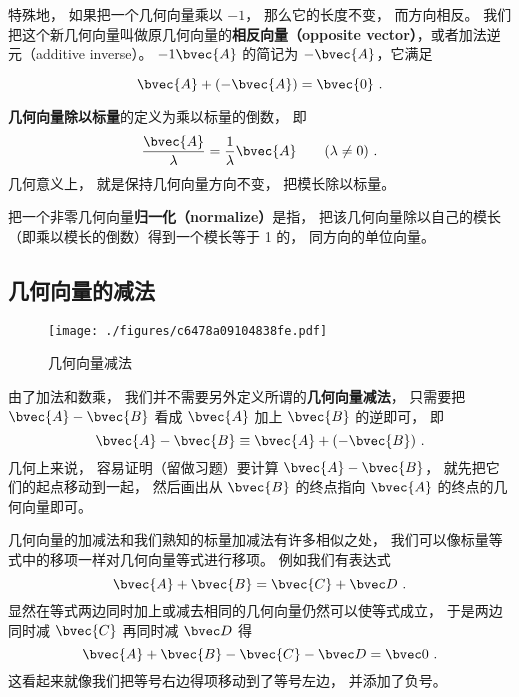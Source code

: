 特殊地， 如果把一个几何向量乘以 $-1$， 那么它的长度不变， 而方向相反。 我们把这个新几何向量叫做原几何向量的\textbf{相反向量（opposite vector）}，或者加法逆元（additive inverse）。 $-1 \bvec{A}$ 的简记为 $-\bvec{A}$，它满足

\begin{equation}
\bvec{A} + (-\bvec{A}) = \bvec{0}~.
\end{equation}

\textbf{几何向量除以标量}的定义为乘以标量的倒数， 即
\begin{equation}
\frac{\bvec{A}}{\lambda} = \frac{1}{\lambda} \bvec{A} \qquad (\lambda \ne 0)~.
\end{equation}
几何意义上， 就是保持几何向量方向不变， 把模长除以标量。

把一个非零几何向量\textbf{归一化（normalize）}是指， 把该几何向量除以自己的模长（即乘以模长的倒数）得到一个模长等于 1 的， 同方向的单位向量。

\subsection{几何向量的减法}

\begin{figure}[ht]
\centering
\texttt{[image: ./figures/c6478a09104838fe.pdf]}
\caption{几何向量减法} \label{fig_GVecOp_3}
\end{figure}
由了加法和数乘， 我们并不需要另外定义所谓的\textbf{几何向量减法}， 只需要把 $\bvec{A} - \bvec{B}$ 看成 $\bvec{A}$ 加上 $\bvec{B}$ 的逆即可， 即
\begin{equation}
\bvec{A} - \bvec{B} \equiv \bvec{A} + (-\bvec{B})~.
\end{equation}
几何上来说， 容易证明（留做习题）要计算 $\bvec{A} - \bvec{B}$， 就先把它们的起点移动到一起， 然后画出从 $\bvec{B}$ 的终点指向 $\bvec{A}$ 的终点的几何向量即可。

几何向量的加减法和我们熟知的标量加减法有许多相似之处， 我们可以像标量等式中的移项一样对几何向量等式进行移项。 例如我们有表达式
\begin{equation}
\bvec{A} + \bvec{B} = \bvec{C} + \bvec D~.
\end{equation}
显然在等式两边同时加上或减去相同的几何向量仍然可以使等式成立， 于是两边同时减 $\bvec{C}$ 再同时减 $\bvec D$ 得
\begin{equation}
\bvec{A} + \bvec{B} - \bvec{C} - \bvec D = \bvec 0~.
\end{equation}
这看起来就像我们把等号右边得项移动到了等号左边， 并添加了负号。

